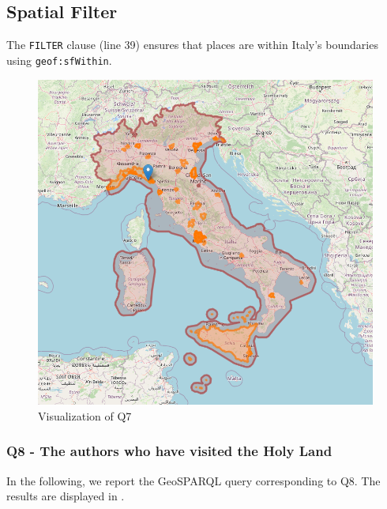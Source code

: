 \subsection*{Spatial Filter}
The \texttt{FILTER} clause (line 39) ensures that places are within Italy’s boundaries using \texttt{geof:sfWithin}.

\begin{figure}[h!tb]
    \centerline {\includegraphics[scale=0.6]{img/italy.png}}
    \caption{Visualization of Q7}
    \label{fig:italy}
\end{figure}

\subsubsection{Q8 - The authors who have visited the Holy Land }
In the following, we report the GeoSPARQL query corresponding to Q8. The results are displayed in .

